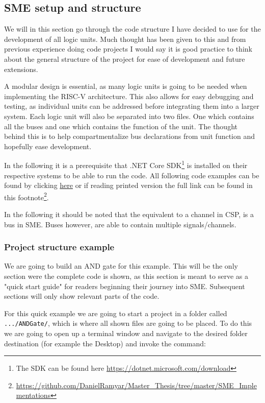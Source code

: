     \subsection{SME setup and structure}
        We will in this section go through the code structure I have decided to use for the development of all logic units. Much thought has been given to this and from previous experience doing code projects I would say it is good practice to think about the general structure of the project for ease of development and future extensions.
        
        A modular design is essential, as many logic units is going to be needed when implementing the RISC-V architecture. This also allows for easy debugging and testing, as individual units can be addressed before integrating them into a larger system. Each logic unit will also be separated into two files. One which contains all the buses and one which contains the function of the unit. The thought behind this is to help compartmentalize bus declarations from unit function and hopefully ease development.  
        
        In the following it is a prerequisite that .NET Core SDK\footnote{The SDK can be found here \url{https://dotnet.microsoft.com/download}} is installed on their respective systems to be able to run the code. All following code examples can be found by clicking \href{https://github.com/DanielRamyar/Master_Thesis/tree/master/SME_Implementations}{here} or if reading printed version the full link can be found in this footnote\footnote{\url{https://github.com/DanielRamyar/Master_Thesis/tree/master/SME_Implementations}}.
        
        In the following it should be noted that the equivalent to a channel in CSP, is a bus in SME. Buses however, are able to contain multiple signals/channels.  
        
        \subsubsection{Project structure example}
        We are going to build an AND gate for this example. This will be the only section were the complete code is shown, as this section is meant to serve as a "quick start guide" for readers beginning their journey into SME. Subsequent sections will only show relevant parts of the code. 
        
        For this quick example we are going to start a project in a folder called \texttt{.../ANDGate/}, which is where all shown files are going to be placed.
        To do this we are going to open up a terminal window and navigate to the desired folder destination (for example the Desktop) and invoke the command: 
        

